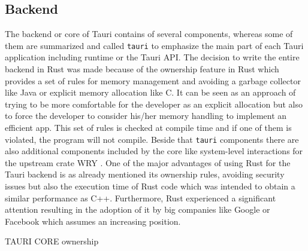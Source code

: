 \subsection{Backend}
\label{subsec:tauri:backend}
The backend or core of Tauri contains of several components, whereas some of them are summarized and called \texttt{tauri} to emphasize the main part of each Tauri application including runtime or the Tauri \ac{API}.
The decision to write the entire backend in Rust was made because of the ownership feature in Rust which provides a set of rules for memory management and avoiding a garbage collector like Java or explicit memory allocation like C.
It can be seen as an approach of trying to be more comfortable for the developer as an explicit allocation but also to force the developer to consider his/her memory handling to implement an efficient app.
This set of rules is checked at compile time and if one of them is violated, the program will not compile.
Beside that \texttt{tauri} components there are also additional components included by the core like system-level interactions for the upstream crate WRY .
One of the major advantages of using Rust for the Tauri backend is as already mentioned its ownership rules, avoiding security issues but also the execution time of Rust code which was intended to obtain a similar performance as C++.
Furthermore, Rust experienced a significant attention resulting in the adoption of it by big companies like Google or Facebook which assumes an increasing position.

TAURI CORE
ownership

